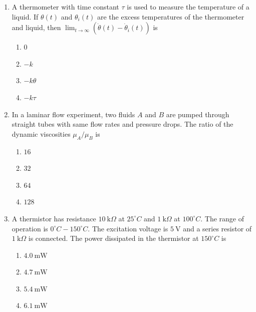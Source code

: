 \documentclass[journal]{IEEEtran}
\begin{document}
\begin{enumerate}
\item A thermometer with time constant $\tau$ is used to measure the temperature of a liquid. If $\theta(t)$ and $\theta_i(t)$ are the excess temperatures of the thermometer and liquid, then $\lim_{t\to \infty} (\dot{\theta}(t) - \dot{\theta}_i(t))$ is  

\begin{multicols}{4}
\begin{enumerate}
\item $0$  
\item $-k$  
\item $-k\theta$  
\item $-k\tau$  
\end{enumerate}
\end{multicols}

\item In a laminar flow experiment, two fluids $A$ and $B$ are pumped through straight tubes with same flow rates and pressure drops. The ratio of the dynamic viscosities $\mu_A / \mu_B$ is  

\begin{multicols}{4}
\begin{enumerate}
\item $16$  
\item $32$  
\item $64$  
\item $128$  
\end{enumerate}
\end{multicols}

\item A thermistor has resistance $10\ \mathrm{k}\Omega$ at $25^\circ C$ and $1\ \mathrm{k}\Omega$ at $100^\circ C$. The range of operation is $0^\circ C - 150^\circ C$. The excitation voltage is $5\ \mathrm{V}$ and a series resistor of $1\ \mathrm{k}\Omega$ is connected. The power dissipated in the thermistor at $150^\circ C$ is  

\begin{multicols}{4}
\begin{enumerate}
\item $4.0\ \mathrm{mW}$  
\item $4.7\ \mathrm{mW}$  
\item $5.4\ \mathrm{mW}$  
\item $6.1\ \mathrm{mW}$  
\end{enumerate}
\end{multicols}






\end{enumerate}
\end{document}
